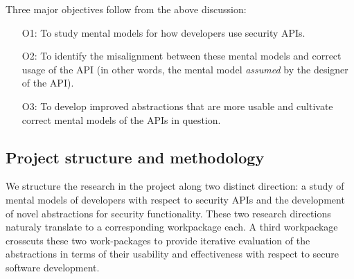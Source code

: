 \documentclass[10pt]{article}
\begin{document}
Three major objectives follow from the above discussion: 
\begin{itemize}
\item[O1:] To study mental models for how developers use security APIs.

\item[O2:] To identify the misalignment between these mental models and correct usage of the API (in other words, the mental model \textit{assumed} by the designer of the API).

\item[O3:] To develop improved abstractions that are more usable and cultivate correct mental models of the APIs in question.
\end{itemize}


\subsection*{Project structure and methodology}


We structure the research in the project along two distinct direction: a study of mental models of developers with respect to security APIs and the development of novel abstractions for security functionality.  These two research directions naturaly translate to a corresponding workpackage each. 
A third workpackage crosscuts these two work-packages to provide iterative evaluation of the abstractions in terms of their usability and effectiveness with respect to secure software development.
\end{document}
